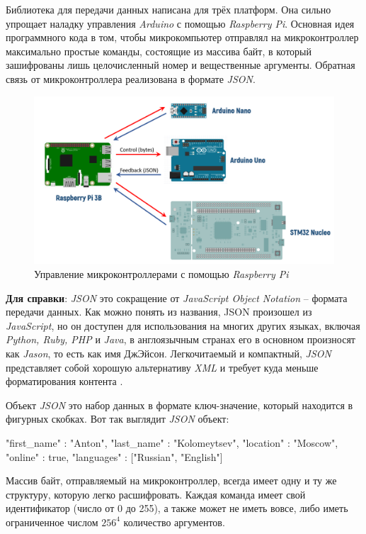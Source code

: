 \noindent Библиотека для передачи данных написана для трёх платформ. Она сильно упрощает наладку управления \textit{Arduino} с помощью \textit{Raspberry Pi}. Основная идея программного кода в том, чтобы микрокомпьютер отправлял на микроконтроллер максимально простые команды, состоящие из массива байт, в который зашифрованы лишь целочисленный номер и вещественные аргументы. Обратная связь от микроконтроллера реализована в формате \textit{JSON}.

\begin{figure}[h]
    \centering
    \includegraphics[scale=0.6]{chapter_arch/figure1.png}
    \caption{Управление микроконтроллерами с помощью \textit{Raspberry Pi}}
    \label{}
\end{figure}

\textbf{Для справки}: \textit{JSON} это сокращение от \textit{JavaScript Object Notation} -- формата передачи данных. Как можно понять из названия, {JSON} произошел из \textit{JavaScript}, но он доступен для использования на многих других языках, включая \textit{Python, Ruby, PHP} и \textit{Java}, в англоязычным странах его в основном произносят как \textit{Jason}, то есть как имя ДжЭйсон. Легкочитаемый и компактный, \textit{JSON} представляет собой хорошую альтернативу \textit{XML} и требует куда меньше форматирования контента \cite{Jayson2018}.

\noindent Объект \textit{JSON} это набор данных в формате ключ-значение, который находится в фигурных скобках.
Вот так выглядит \textit{JSON} объект:
\begin{code}
{
  "first_name" : "Anton",
  "last_name" : "Kolomeytsev",
  "location" : "Moscow",
  "online" : true,
  "languages" : ["Russian", "English"] 
}
\end{code}

Массив байт, отправляемый на микроконтроллер, всегда имеет одну и ту же структуру, которую легко расшифровать. Каждая команда имеет свой идентификатор (число от 0 до 255), а также может не иметь вовсе, либо иметь ограниченное числом $ 256^4 $ количество аргументов. 

